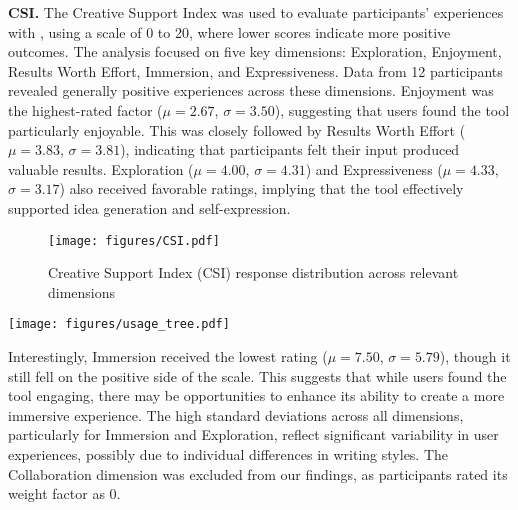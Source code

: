 \textbf{CSI.} The Creative Support Index was used to evaluate participants' experiences with \system, using a scale of 0 to 20, where lower scores indicate more positive outcomes. The analysis focused on five key dimensions: Exploration, Enjoyment, Results Worth Effort, Immersion, and Expressiveness. Data from 12 participants revealed generally positive experiences across these dimensions. Enjoyment was the highest-rated factor ($\mu = 2.67$, $\sigma = 3.50$), suggesting that users found the tool particularly enjoyable. This was closely followed by Results Worth Effort ($\mu = 3.83$, $\sigma = 3.81$), indicating that participants felt their input produced valuable results. Exploration ($\mu = 4.00$, $\sigma = 4.31$) and Expressiveness ($\mu = 4.33$, $\sigma = 3.17$) also received favorable ratings, implying that the tool effectively supported idea generation and self-expression.

\begin{figure}[!t]
  \centering
  \texttt{[image: figures/CSI.pdf]}
  \caption{Creative Support Index (CSI) response distribution across relevant dimensions}
  \label{fig:csi}
\end{figure}






\begin{figure*}[t!]
    \centering
    \texttt{[image: figures/usage\_tree.pdf]}
    \caption{}
    \label{fig:participant-journey}
\end{figure*}

Interestingly, Immersion received the lowest rating ($\mu = 7.50$, $\sigma = 5.79$), though it still fell on the positive side of the scale. This suggests that while users found the tool engaging, there may be opportunities to enhance its ability to create a more immersive experience. The high standard deviations across all dimensions, particularly for Immersion and Exploration, reflect significant variability in user experiences, possibly due to individual differences in writing styles. The Collaboration dimension was excluded from our findings, as participants rated its weight factor as 0. 

